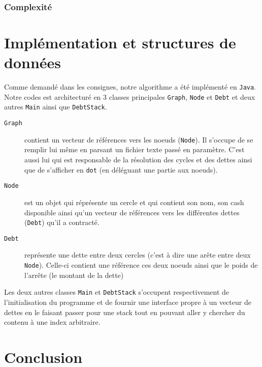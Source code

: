 \documentclass[12pt, oneside]{article}
\begin{document}
\subsubsection{Complexité}

\section{Implémentation et structures de données}
Comme demandé dans les consignes, notre algorithme a été implémenté en \texttt{Java}. Notre codes est architecturé en 3 classes principales \texttt{Graph}, \texttt{Node} et \texttt{Debt} et deux autres \texttt{Main} ainsi que \texttt{DebtStack}.

\begin{description}
\item[\texttt{Graph}] contient un vecteur de références vers les noeuds (\texttt{Node}). Il s'occupe de se remplir lui même en parsant un fichier texte passé en paramètre. C'est aussi lui qui est responsable de la résolution des cycles et des dettes ainsi que de s'afficher en \texttt{dot} (en déléguant une partie aux noeuds).
\item[\texttt{Node}] est un objet qui réprésente un cercle et qui contient son nom, son cash disponible ainsi qu'un vecteur de références vers les différentes dettes 
(\texttt{Debt}) qu'il a contracté.
\item[\texttt{Debt}] représente une dette entre deux cercles (c'est à dire une arête entre deux \texttt{Node}). Celle-ci contient une référence ces deux noeuds ainsi que le poids de l'arrête (le montant de la dette)
\end{description}
Les deux autres classes \texttt{Main} et \texttt{DebtStack} s'occupent respectivement de l'initialisation du programme et de fournir une interface propre à un vecteur de dettes en le faisant passer pour une stack tout en pouvant aller y chercher du contenu à une index arbitraire.

\section{Conclusion}
\end{document}
